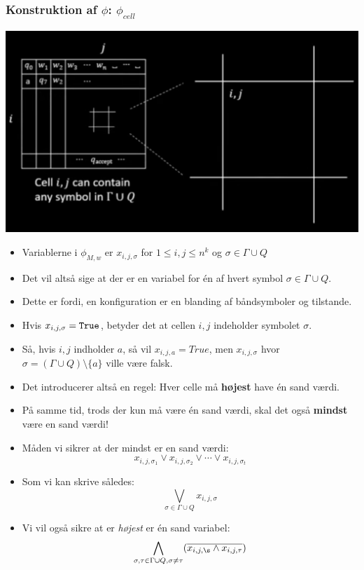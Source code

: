 \begin{frame}[allowframebreaks]
	\frametitle{Konstruktion af \(\phi\): \(\phi_{cell}\)}
	\begin{center}
		\includegraphics[scale=0.3]{figur/video16c.png}
	\end{center}
	\begin{itemize}
		\item Variablerne i \(\phi_{M,w}\) er $x_{i,j,\sigma}$ for $1 \le i,j \le n^{k}$ og $\sigma \in \Gamma \cup Q$
		\item Det vil altså sige at der er en variabel for én af hvert symbol $\sigma \in \Gamma \cup Q$.
	  \item Dette er fordi, en konfiguration er en blanding af båndsymboler og tilstande.
		\item Hvis $x_{i,j,\sigma} = \text{\texttt{True}}$, betyder det at cellen $i,j$ indeholder symbolet \(\sigma\).
	  \item Så, hvis $i,j$ indholder $a$, så vil $x_{i,j,a} = True$, men $x_{i,j,\sigma}$ hvor $\sigma = (\Gamma \cup Q) \setminus \{a\}$ ville være falsk.
	  \item Det introducerer altså en regel: Hver celle må \textbf{højest} have én sand værdi.
	  \item På samme tid, trods der kun må være én sand værdi, skal det også \textbf{mindst} være en sand værdi!
	  \item Måden vi sikrer at der mindst er en sand værdi:
			\begin{equation}
x_{i,j,\sigma_{1}} \lor x_{i,j,\sigma_{2}} \lor \cdots \lor x_{i,j,\sigma_{t}}
			\end{equation}
	  \item Som vi kan skrive således:
			\begin{equation}
\bigvee_{\sigma \in \Gamma \cup Q} x_{i,j,\sigma}
			\end{equation}
	  \item Vi vil også sikre at er \textit{højest} er én sand variabel:
			\begin{equation}
\bigwedge_{\sigma, \tau \in \Gamma \cup Q, \sigma \ne \tau} (\overline{x_{i,j,\s} \land x_{i,j,\tau}})
			\end{equation}


\end{itemize}
\end{frame}
